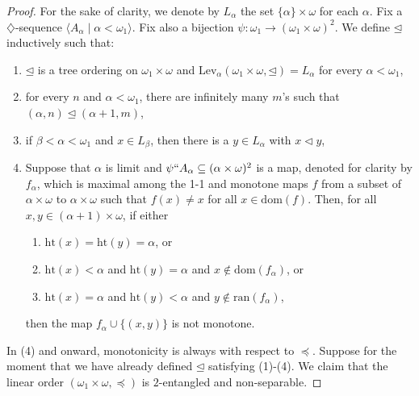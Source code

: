 \documentclass[10pt,a4paper]{amsart}
\begin{document}
\begin{proof}
For the sake of clarity, we denote by $L_\alpha$ the set  $\{\alpha\}\times \omega$ for each $\alpha$. Fix a $\diamondsuit$-sequence $\langle A_\alpha \mid \alpha < \omega_1\rangle$. Fix also a bijection $\psi: \omega_1 \rightarrow (\omega_1 \times \omega)^2$.  We define $\unlhd$ inductively such that:\vspace{0.3em}
\begin{enumerate}
\itemsep0.3em
\item $\unlhd$ is a tree ordering on $\omega_1 \times \omega$ and $\mathrm{Lev}_\alpha(\omega_1 \times \omega, \unlhd) = L_\alpha$ for every $\alpha < \omega_1$,
\item for every $n$ and $\alpha < \omega_1$, there are infinitely many $m$'s such that $(\alpha, n) \unlhd (\alpha+1, m)$,
\item if $\beta < \alpha < \omega_1$ and $x \in L_\beta$, then there is a $y \in L_\alpha$ with $x \lhd y$,
\item Suppose that $\alpha$ is limit and $\psi``A_\alpha \subseteq (\alpha\times \omega)^2$ is a map, denoted for clarity by $f_\alpha$, which is maximal among the 1-1 and monotone maps $f$ from a subset of $\alpha \times \omega$ to $\alpha \times \omega$ such that $f(x) \neq x$ for all $x \in \mathrm{dom}(f)$. Then, for all $x,y \in (\alpha+1) \times \omega$, if either

\smallskip
\begin{enumerate}[label=(4\alph*)]
\item $\mathrm{ht}(x) = \mathrm{ht}(y) = \alpha$, or
\item $\mathrm{ht}(x) < \alpha$ and $\mathrm{ht}(y) = \alpha$ and $x \not\in \mathrm{dom}(f_\alpha)$, or
\item $\mathrm{ht}(x) = \alpha$ and $\mathrm{ht}(y) < \alpha$ and $y \not\in \mathrm{ran}(f_\alpha)$,
\end{enumerate}

\smallskip
\noindent then the map $f_\alpha \cup \{(x,y)\}$ is not monotone.\vspace{0.3em}
\end{enumerate}

In (4) and onward, monotonicity is always with respect to $\preceq$.
Suppose for the moment that we have already defined $\unlhd$ satisfying (1)-(4). We claim that the linear order $(\omega_1 \times \omega, \preceq)$ is $2$-entangled and non-separable.


\end{proof}
\end{document}

